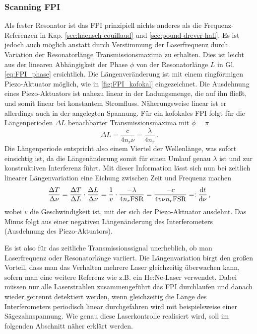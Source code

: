 \subsubsection{Scanning FPI}\label{subsubsec:scanning_FPI}
Als fester Resonator ist das FPI prinzipiell nichts anderes als die
Frequenz-Referenzen in Kap. \ref{sec:haensch-couillaud} und
\ref{sec:pound-drever-hall}. Es ist jedoch auch möglich anstatt durch
Verstimmung der Laserfrequenz durch Variation der Resonatorlänge
Transmissionsmaxima zu erhalten. Dies ist leicht aus der linearen Abhängigkeit
der Phase $\phi$ von der Resonatorlänge $L$ in Gl. \eqref{eq:FPI_phase}
ersichtlich. Die Längenveränderung ist mit einem ringförmigen Piezo-Aktuator
möglich, wie in \ref{fig:FPI_kofokal} eingezeichnet. Die Ausdehnung eines
Piezo-Aktuators ist nahezu linear in der Ladungsmenge, die auf ihn fließt, und
somit linear bei konstantem Stromfluss. Näherungsweise linear ist er allerdings
auch in der angelegten Spannung. Für ein kofokales FPI folgt für die Längenperioden $\Delta L$
benachbarter Transmissionsmaxima mit $\phi=\pi$
\begin{equation}\label{eq:FPI_laengenperiode}
	\Delta L=\frac{c}{4n_r\nu}=\frac{\lambda}{4n_r}\,.
\end{equation}
Die Längenperiode entspricht also einem Viertel der Wellenlänge, was sofort
einsichtig ist, da die Längenänderung somit für einen Umlauf genau $\lambda$ ist
und zur konstruktiven Interferenz führt. Mit dieser Information lässt sich nun
bei zeitlich linearer Längenvariation eine Eichung zwischen Zeit und Frequenz
machen
\begin{equation}\label{eq:FPI_zeit-eichung}
	\frac{\Delta T}{\Delta\nu}=\frac{\Delta T}{\Delta L}\cdot\frac{\Delta
	L}{\Delta\nu}=\frac{1}{v}\cdot\frac{-\lambda}{4n_r\text{FSR}}=\frac{-c}{4v\nu
	n_r\text{FSR}}=:\frac{\mathrm{d} t}{\mathrm{d} \nu}\,,
\end{equation}
wobei $v$ die Geschwindigkeit ist, mit der sich der Piezo-Aktuator ausdehnt.
Das Minus folgt aus einer negativen Längenänderung des Interferometers
(Ausdehnung des Piezo-Aktuators).\par
Es ist also für das zeitliche Transmissionssignal unerheblich, ob man
Laserfrequenz oder Resonatorlänge variiert. Die Längenvariation birgt den großen
Vorteil, dass man das Verhalten mehrere Laser gleichzeitig überwachen kann,
sofern man eine weitere Referenz wie z.B. ein He:Ne-Laser verwendet.
Dabei müssen nur alle Laserstrahlen zusammengeführt das FPI durchlaufen und danach
wieder getrennt detektiert werden, wenn gleichzeitig die Länge des
Interferometers periodisch linear durchgefahren wird mit beispielsweise einer
Sägezahnspannung. Wie genau diese Laserkontrolle realisiert wird, soll im
folgenden Abschnitt näher erklärt werden.

